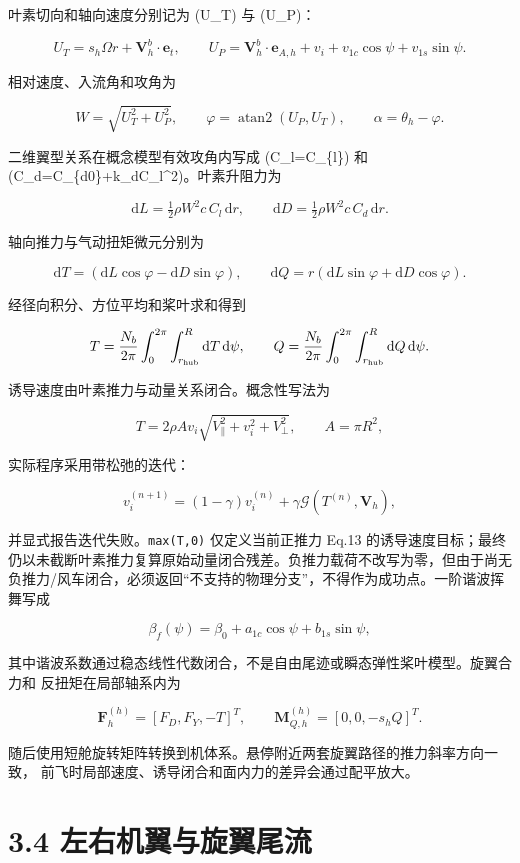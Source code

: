 \documentclass[UTF8,11pt,oneside,openany,fontset=windows]{ctexbook}
\begin{document}
叶素切向和轴向速度分别记为 (U\_T) 与 (U\_P)：

\[
U_T=s_h\Omega r+\mathbf V_h^b\cdot\mathbf e_t,\qquad
U_P=\mathbf V_h^b\cdot\mathbf e_{A,h}+v_i+v_{1c}\cos\psi+v_{1s}\sin\psi.
\]

相对速度、入流角和攻角为

\[
W=\sqrt{U_T^2+U_P^2},\qquad
\varphi=\operatorname{atan2}(U_P,U_T),\qquad
\alpha=\theta_h-\varphi .
\]

二维翼型关系在概念模型有效攻角内写成 (C\_l=C\_\{l\alpha\}\alpha) 和
(C\_d=C\_\{d0\}+k\_dC\_l\^{}2)。叶素升阻力为

\[
\mathrm dL=\tfrac12\rho W^2c\,C_l\,\mathrm dr,\qquad
\mathrm dD=\tfrac12\rho W^2c\,C_d\,\mathrm dr.
\]

轴向推力与气动扭矩微元分别为

\[
\mathrm dT=(\mathrm dL\cos\varphi-\mathrm dD\sin\varphi),\qquad
\mathrm dQ=r(\mathrm dL\sin\varphi+\mathrm dD\cos\varphi).
\]

经径向积分、方位平均和桨叶求和得到

\[
T=\frac{N_b}{2\pi}\int_0^{2\pi}\int_{r_{\rm hub}}^R\mathrm dT\,\mathrm d\psi,
\qquad
Q=\frac{N_b}{2\pi}\int_0^{2\pi}\int_{r_{\rm hub}}^R\mathrm dQ\,\mathrm d\psi .
\]

诱导速度由叶素推力与动量关系闭合。概念性写法为

\[
T=2\rho A v_i\sqrt{V_\parallel^2+v_i^2+V_\perp^2},
\qquad A=\pi R^2,
\]

实际程序采用带松弛的迭代：

\[
v_i^{(n+1)}=(1-\gamma)v_i^{(n)}+\gamma\mathcal G(T^{(n)},\mathbf V_h),
\]

并显式报告迭代失败。\texttt{max(T,0)} 仅定义当前正推力 Eq.13
的诱导速度目标；最终仍以未截断叶素推力复算原始动量闭合残差。负推力载荷不改写为零，但由于尚无负推力/风车闭合，必须返回``不支持的物理分支''，不得作为成功点。一阶谐波挥舞写成

\[
\beta_f(\psi)=\beta_0+a_{1c}\cos\psi+b_{1s}\sin\psi,
\]

其中谐波系数通过稳态线性代数闭合，不是自由尾迹或瞬态弹性桨叶模型。旋翼合力和
反扭矩在局部轴系内为

\[
\mathbf F_h^{(h)}=[F_D,F_Y,-T]^T,\qquad
\mathbf M_{Q,h}^{(h)}=[0,0,-s_hQ]^T.
\]

随后使用短舱旋转矩阵转换到机体系。悬停附近两套旋翼路径的推力斜率方向一致，
前飞时局部速度、诱导闭合和面内力的差异会通过配平放大。

\section{3.4
左右机翼与旋翼尾流}\label{ux5de6ux53f3ux673aux7ffcux4e0eux65cbux7ffcux5c3eux6d41}
\end{document}
